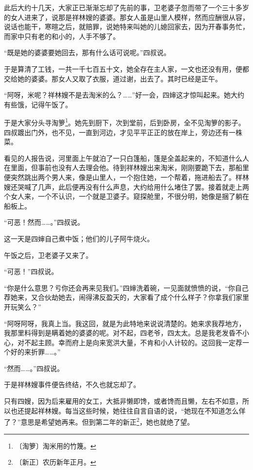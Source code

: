 \documentclass[12pt,UTF-8,openany]{ctexbook}
\begin{document}
\begin{normalsize}
    此后大约十几天，大家正已渐渐忘却了先前的事，卫老婆子忽而带了一个三十多岁的女人进来了，说那是祥林嫂的婆婆。那女人虽是山里人模样，然而应酬很从容，说话也能干，寒暄之后，就赔罪，说她特来叫她的儿媳回家去，因为开春事务忙，而家中只有老的和小的，人手不够了。
    
    “既是她的婆婆要她回去，那有什么话可说呢。”四叔说。
    
    于是算清了工钱，一共一千七百五十文，她全存在主人家，一文也还没有用，便都交给她的婆婆。那女人又取了衣服，道过谢，出去了。其时已经是正午。
    
    “阿呀，米呢？祥林嫂不是去淘米的么？……”好一会，四婶这才惊叫起来。她大约有些饿，记得午饭了。
    
    于是大家分头寻淘箩\footnote{〔淘箩〕淘米用的竹篾。}。她先到厨下，次到堂前，后到卧房，全不见淘箩的影子。四叔踱出门外，也不见，一直到河边，才见平平正正的放在岸上，旁边还有一株菜。
    
    看见的人报告说，河里面上午就泊了一只白篷船，篷是全盖起来的，不知道什么人在里面，但事前也没有人去理会他。待到祥林嫂出来淘米，刚刚要跪下去，那船里便突然跳出两个男人来，像是山里人，一个抱住她，一个帮着，拖进船去了。样林嫂还哭喊了几声，此后便再没有什么声息，大约给用什么堵住了罢。接着就走上两个女人来，一个不认识，一个就是卫婆子。窥探舱里，不很分明，她像是捆了躺在船板上。
    
    “可恶！然而……。”四叔说。
    
    这一天是四婶自己煮中饭；他们的儿子阿牛烧火。
    
    午饭之后，卫老婆子又来了。
    
    “可恶！”四叔说。
    
    “你是什么意思？亏你还会再来见我们。”四婶洗着碗，一见面就愤愤的说，“你自己荐她来，又合伙劫她去，闹得沸反盈天的，大家看了成个什么样子？你拿我们家里开玩笑么？”
    
    “阿呀阿呀，我真上当。我这回，就是为此特地来说说清楚的。她来求我荐地方，我那里料得到是瞒着她的婆婆的呢。对不起，四老爷，四太太。总是我老发昏不小心，对不起主顾。幸而府上是向来宽洪大量，不肯和小人计较的。这回我一定荐一个好的来折罪……。”
    
    “然而……。”四叔说。
    
    于是祥林嫂事件便告终结，不久也就忘却了。
    
    只有四嫂，因为后来雇用的女工，大抵非懒即馋，或者馋而且懒，左右不如意，所以也还提起祥林嫂。每当这些时候，她往往自言自语的说，“她现在不知道怎么佯了？”意思是希望她再来。但到第二年的新正\footnote{〔新正〕农历新年正月。}，她也就绝了望。
    

\end{normalsize}
\end{document}
